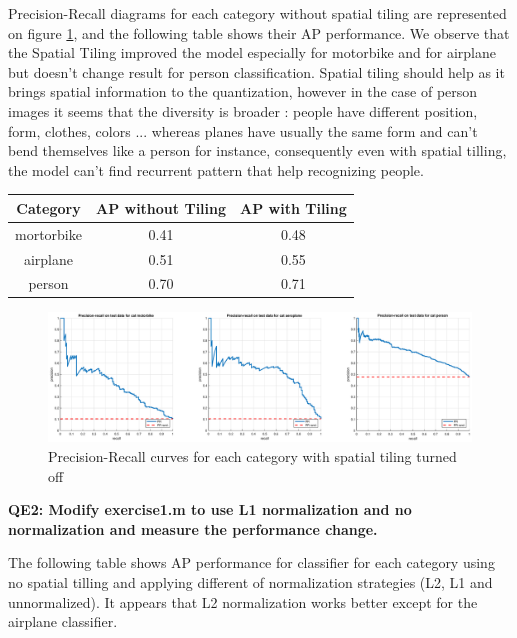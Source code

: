 \documentclass[a4paper,11pt]{exam}
\begin{document}
Precision-Recall diagrams for each category without spatial tiling are represented on figure \ref{til_true_precision-recall}, and the following table shows their AP performance. We observe that the Spatial Tiling improved the model especially for motorbike and for airplane but doesn't change result for person classification.
Spatial tiling should help as it brings spatial information to the quantization, however in the case of person images it seems that the diversity is broader : people have different position, form, clothes, colors ... whereas planes have usually the same form and can't bend themselves like a person for instance, consequently even with spatial tilling, the model can't find recurrent pattern that help recognizing people.\\

\begin{center}
	\begin{tabular}{ c | c | c }
   		 \hline
		   Category & AP without Tiling &  AP with Tiling \\	
		   \hline
   		  mortorbike & 0.41 & 0.48 \\
  		  airplane & 0.51 & 0.55 \\
		  person & 0.70 & 0.71 \\
		\hline
 	\end{tabular}
\end{center}

\begin{figure}[!h]
\centering
\includegraphics[width=15cm]{figures/til_true_precision-recall.eps}
\caption{Precision-Recall curves for each category with spatial tiling turned off}    
\label{til_true_precision-recall}
\end{figure}


\textbf{QE2: Modify exercise1.m to use L1 normalization and no normalization and measure the performance change.\\}

The following table shows AP performance for classifier for each category using no spatial tilling and applying different of normalization strategies (L2, L1 and unnormalized). It appears that L2 normalization works better except for the airplane classifier.
\end{document}
